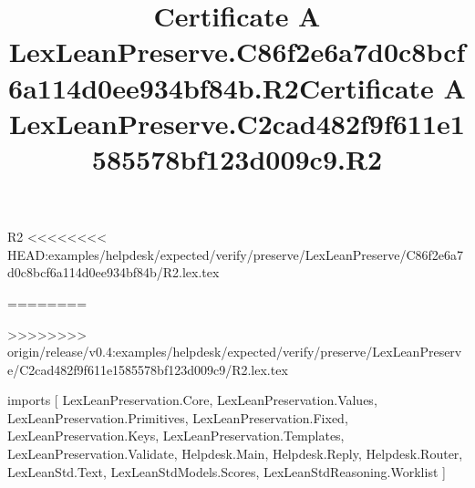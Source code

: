 \begin{lexlean}{R2}
<<<<<<<< HEAD:examples/helpdesk/expected/verify/preserve/LexLeanPreserve/C86f2e6a7d0c8bcf6a114d0ee934bf84b/R2.lex.tex
\title{Certificate A LexLeanPreserve.C86f2e6a7d0c8bcf6a114d0ee934bf84b.R2}
========
\title{Certificate A LexLeanPreserve.C2cad482f9f611e1585578bf123d009c9.R2}
>>>>>>>> origin/release/v0.4:examples/helpdesk/expected/verify/preserve/LexLeanPreserve/C2cad482f9f611e1585578bf123d009c9/R2.lex.tex
\begin{coremodule}
imports [
  LexLeanPreservation.Core,
  LexLeanPreservation.Values,
  LexLeanPreservation.Primitives,
  LexLeanPreservation.Fixed,
  LexLeanPreservation.Keys,
  LexLeanPreservation.Templates,
  LexLeanPreservation.Validate,
  Helpdesk.Main,
  Helpdesk.Reply,
  Helpdesk.Router,
  LexLeanStd.Text,
  LexLeanStdModels.Scores,
  LexLeanStdReasoning.Worklist
]


\end{coremodule}
\end{lexlean}

